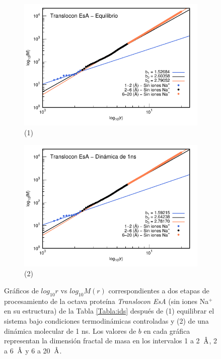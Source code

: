 	
	\begin{figure}[H]
		\centering
		\begin{subfigure}{0.49\textwidth}
			\centering
			\includegraphics[width=\linewidth,page=1]{graphs/PDBs/7khw/ions/7khwEq-oions.pdf}
			\caption{(1)}
		\end{subfigure}
		\hfill
		\begin{subfigure}{0.49\textwidth}
			\centering
			\includegraphics[width=\linewidth,page=1]{graphs/PDBs/7khw/ions/7khw1ns-oions.pdf}
			\caption{(2)}
		\end{subfigure}
		\caption{Gr\'{a}ficos de $log_{10}r$ vs $log_{10}M(r)$ correspondientes a dos etapas de procesamiento de la octava prote\'{i}na \textit{Translocon EsA} (sin iones Na$^{+}$ en su estructura) de la Tabla \ref{Tabla:ids} despu\'{e}s de (1) equilibrar el sistema bajo condiciones termodin\'{a}micas controladas y (2) de una din\'{a}mica molecular de 1 ns. Los valores de $b$ en cada gr\'{a}fica representan la dimensi\'{o}n fractal de masa en los intervalos 1 a 2~$\textup{\r{A}}$, 2 a 6~$\textup{\r{A}}$ y 6 a 20~$\textup{\r{A}}$.}
		\label{fig:7khw-oions}
	\end{figure}
	
